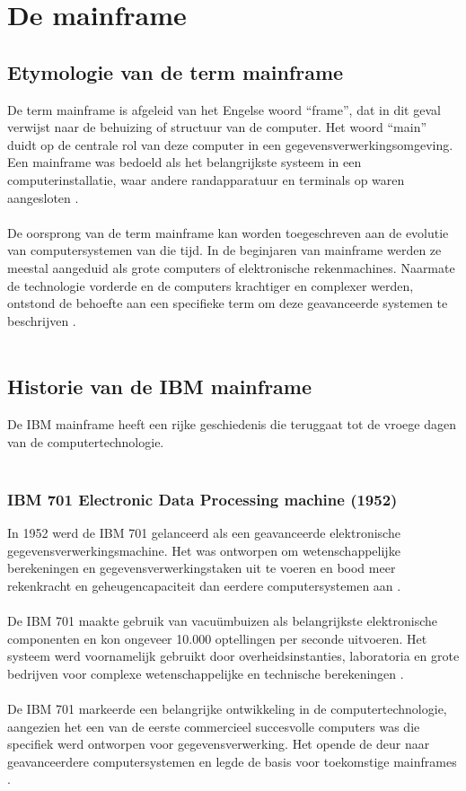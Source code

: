 \section{De mainframe}
\label{sec:de mainframe}

\subsection{Etymologie van de term mainframe}
De term mainframe is afgeleid van het Engelse woord \enquote{frame}, dat in dit geval verwijst naar de behuizing of structuur van de computer. Het woord \enquote{main} duidt op de centrale rol van deze computer in een gegevensverwerkingsomgeving. Een mainframe was bedoeld als het belangrijkste systeem in een computerinstallatie, waar andere randapparatuur en terminals op waren aangesloten \autocite{IBM2024}.
\\ \\
De oorsprong van de term mainframe kan worden toegeschreven aan de evolutie van computersystemen van die tijd. In de beginjaren van mainframe werden ze meestal aangeduid als grote computers of elektronische rekenmachines. Naarmate de technologie vorderde en de computers krachtiger en complexer werden, ontstond de behoefte aan een specifieke term om deze geavanceerde systemen te beschrijven \autocite{IBM2024}.
\\ \\
\subsection{Historie van de IBM mainframe}
De IBM mainframe heeft een rijke geschiedenis die teruggaat tot de vroege dagen van de computertechnologie.
\\ \\
\subsubsection{IBM 701 Electronic Data Processing machine (1952)}
In 1952 werd de IBM 701 gelanceerd als een geavanceerde elektronische gegevensverwerkingsmachine. Het was ontworpen om wetenschappelijke berekeningen en gegevensverwerkingstaken uit te voeren en bood meer rekenkracht en geheugencapaciteit dan eerdere computersystemen aan \autocite{IBM2024a}.
\\ \\
De IBM 701 maakte gebruik van vacuümbuizen als belangrijkste elektronische componenten en kon ongeveer 10.000 optellingen per seconde uitvoeren. Het systeem werd voornamelijk gebruikt door overheidsinstanties, laboratoria en grote bedrijven voor complexe wetenschappelijke en technische berekeningen \autocite{IBM2024a}.
\\ \\
De IBM 701 markeerde een belangrijke ontwikkeling in de computertechnologie, aangezien het een van de eerste commercieel succesvolle computers was die specifiek werd ontworpen voor gegevensverwerking. Het opende de deur naar geavanceerdere computersystemen en legde de basis voor toekomstige mainframes .
\\ \\
